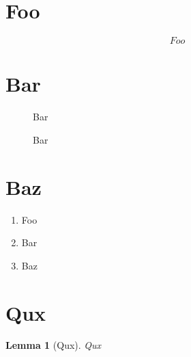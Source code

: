 \documentclass{article}
\begin{document}
\section{Foo}\label{sec:foo}

\begin{equation}\label{eq:foo}
    Foo
\end{equation}

\section{Bar}\label{sec:bar}

\begin{figure}
    Bar
    \caption{Bar}
    \label{fig:bar}
\end{figure}

\section{Baz}\label{sec:baz}

\begin{enumerate}
    \item\label{itm:foo} Foo
    \item\label{itm:bar} Bar
    \item\label{itm:baz} Baz    
\end{enumerate}

\section{Qux}\label{sec:qux}

\newtheorem{lemma}{Lemma}

\begin{lemma}[Qux]\label{thm:qux}
    Qux
\end{lemma}
\end{document}
